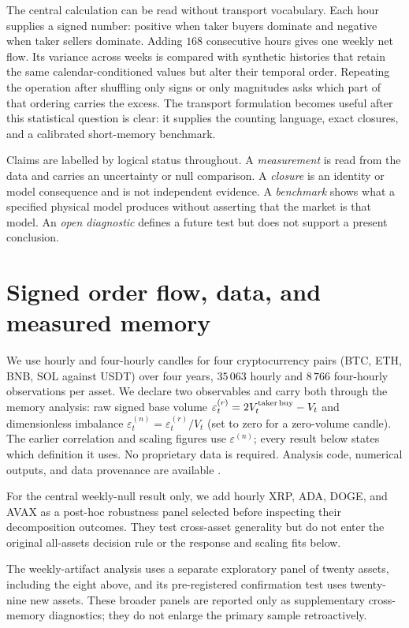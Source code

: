 \documentclass[aps,pre,twocolumn,superscriptaddress,floatfix,nofootinbib]{revtex4-2}
\newcommand{\eps}{\varepsilon}
\begin{document}
The central calculation can be read without transport vocabulary. Each hour
supplies a signed number: positive when taker buyers dominate and negative when
taker sellers dominate. Adding $168$ consecutive hours gives one weekly net
flow. Its variance across weeks is compared with synthetic histories that
retain the same calendar-conditioned values but alter their temporal order.
Repeating the operation after shuffling only signs or only magnitudes asks which
part of that ordering carries the excess. The transport formulation becomes
useful after this statistical question is clear: it supplies the counting
language, exact closures, and a calibrated short-memory benchmark.

Claims are labelled by logical status throughout. A \emph{measurement} is read
from the data and carries an uncertainty or null comparison. A \emph{closure}
is an identity or model consequence and is not independent evidence. A
\emph{benchmark} shows what a specified physical model produces without
asserting that the market is that model. An \emph{open diagnostic} defines a
future test but does not support a present conclusion.

\section{Signed order flow, data, and measured memory}
\label{sec:data}

We use hourly and four-hourly candles for four cryptocurrency pairs (BTC, ETH,
BNB, SOL against USDT) over four years, $35\,063$ hourly and $8\,766$
four-hourly observations per asset. We declare two observables and carry both
through the memory analysis: raw signed base volume
$\eps_t^{(r)}=2V^{\rm taker\,buy}_t-V_t$ and dimensionless imbalance
$\eps_t^{(n)}=\eps_t^{(r)}/V_t$ (set to zero for a zero-volume candle). The
earlier correlation and scaling figures use $\eps^{(n)}$; every result below
states which definition it uses. No proprietary data is required. Analysis
code, numerical outputs, and data provenance are available
\cite{code_keldysh_finance}.

For the central weekly-null result only, we add hourly XRP, ADA, DOGE, and AVAX
as a post-hoc robustness panel selected before inspecting their decomposition
outcomes. They test cross-asset generality but do not enter the original
all-assets decision rule or the response and scaling fits below.

The weekly-artifact analysis uses a separate exploratory panel of twenty
assets, including the eight above, and its pre-registered confirmation test
uses twenty-nine new assets. These broader panels are reported only as
supplementary cross-memory diagnostics; they do not enlarge the primary sample
retroactively.
\end{document}
